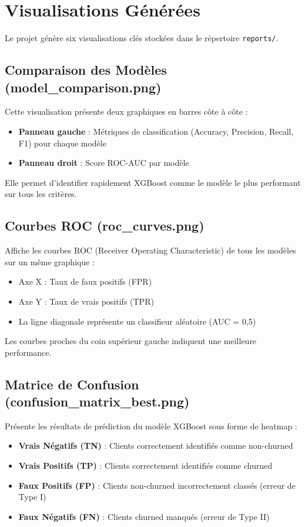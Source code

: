 \documentclass[11pt,a4paper]{article}
\begin{document}
\section{Visualisations Générées}

Le projet génère six visualisations clés stockées dans le répertoire \texttt{reports/}.

\subsection{Comparaison des Modèles (model\_comparison.png)}

Cette visualisation présente deux graphiques en barres côte à côte :
\begin{itemize}
    \item \textbf{Panneau gauche} : Métriques de classification (Accuracy, Precision, Recall, F1) pour chaque modèle
    \item \textbf{Panneau droit} : Score ROC-AUC par modèle
\end{itemize}

Elle permet d'identifier rapidement XGBoost comme le modèle le plus performant sur tous les critères.

\subsection{Courbes ROC (roc\_curves.png)}

Affiche les courbes ROC (Receiver Operating Characteristic) de tous les modèles sur un même graphique :
\begin{itemize}
    \item Axe X : Taux de faux positifs (FPR)
    \item Axe Y : Taux de vrais positifs (TPR)
    \item La ligne diagonale représente un classifieur aléatoire (AUC = 0,5)
\end{itemize}

Les courbes proches du coin supérieur gauche indiquent une meilleure performance.

\subsection{Matrice de Confusion (confusion\_matrix\_best.png)}

Présente les résultats de prédiction du modèle XGBoost sous forme de heatmap :
\begin{itemize}
    \item \textbf{Vrais Négatifs (TN)} : Clients correctement identifiés comme non-churned
    \item \textbf{Vrais Positifs (TP)} : Clients correctement identifiés comme churned
    \item \textbf{Faux Positifs (FP)} : Clients non-churned incorrectement classés (erreur de Type I)
    \item \textbf{Faux Négatifs (FN)} : Clients churned manqués (erreur de Type II)
\end{itemize}
\end{document}
